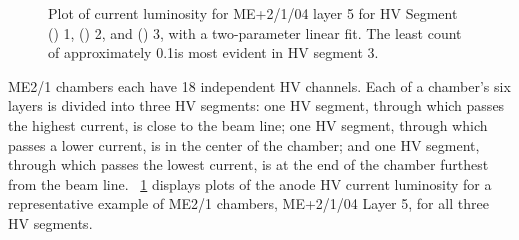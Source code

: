 \begin{figure}
\caption{Plot of current \vs luminosity for ME+2/1/04 layer 5 for HV Segment () 1, () 2, and () 3, with a two-parameter linear fit. The least count of approximately 0.1\muA is most evident in HV segment 3.}
    \label{fig:ME21_curr_lumi_p214_5}
\end{figure}

ME2/1 chambers each have 18 independent HV channels. Each of a chamber's six layers is divided into three HV segments: one HV segment, through which passes the highest current, is close to the beam line; one HV segment, through which passes a lower current, is in the center of the chamber; and one HV segment, through which passes the lowest current, is at the end of the chamber furthest from the beam line. \Fig~\ref{fig:ME21_curr_lumi_p214_5} displays plots of the anode HV current \vs luminosity for a representative example of ME2/1 chambers, ME+2/1/04 Layer 5, for all three HV segments.

